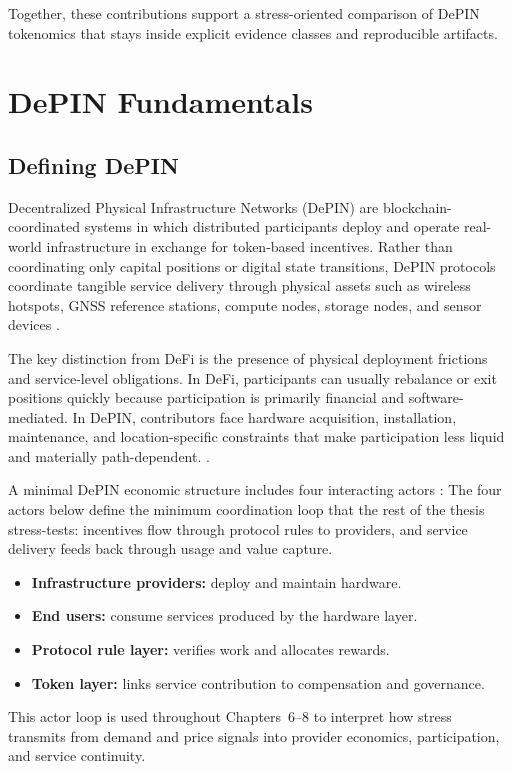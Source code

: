 Together, these contributions support a stress-oriented comparison of DePIN tokenomics that stays inside explicit evidence classes and reproducible artifacts.


\section{DePIN Fundamentals}
\label{sec:depin_fundamentals}

\subsection{Defining DePIN}
Decentralized Physical Infrastructure Networks (DePIN) are blockchain-coordinated systems in which distributed participants deploy and operate real-world infrastructure in exchange for token-based incentives. Rather than coordinating only capital positions or digital state transitions, DePIN protocols coordinate tangible service delivery through physical assets such as wireless hotspots, GNSS reference stations, compute nodes, storage nodes, and sensor devices \cite{FrontiersDePIN2025, Ballandies2023, AndrewBallandies2025}.

The key distinction from DeFi is the presence of physical deployment frictions and service-level obligations. In DeFi, participants can usually rebalance or exit positions quickly because participation is primarily financial and software-mediated. In DePIN, contributors face hardware acquisition, installation, maintenance, and location-specific constraints that make participation less liquid and materially path-dependent.
\cite{Halaburda2021, Arthur1989}.

A minimal DePIN economic structure includes four interacting actors \cite{RochetTirole2003, Chiu2024}:
The four actors below define the minimum coordination loop that the rest of the thesis stress-tests: incentives flow through protocol rules to providers, and service delivery feeds back through usage and value capture.
\begin{itemize}
    \item \textbf{Infrastructure providers:} deploy and maintain hardware.
    \item \textbf{End users:} consume services produced by the hardware layer.
    \item \textbf{Protocol rule layer:} verifies work and allocates rewards.
    \item \textbf{Token layer:} links service contribution to compensation and governance.
\end{itemize}
This actor loop is used throughout Chapters~6--8 to interpret how stress transmits from demand and price signals into provider economics, participation, and service continuity.

